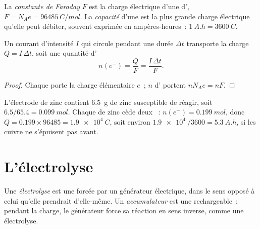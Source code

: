\begin{definition}\label{def:g12:cells-and-electrolysis:capacity}
La \emph{constante de Faraday} $F$ est la
charge électrique d'une  d', $F = N_A e = \qty{96485}{C/mol}$.
La \emph{capacité} d'une  est la plus grande charge
électrique qu'elle peut débiter, souvent exprimée en ampères-heures~:
$\qty{1}{A.h} = \qty{3600}{C}$.
\end{definition}

\begin{proposition}\label{prop:g12:cells-and-electrolysis:charge}
Un courant d'intensité $I$ qui circule pendant une durée $\Delta t$
transporte la charge
$Q = I\,\Delta t$, soit une quantité d'
\[
  n(e^-) = \frac{Q}{F} = \frac{I\,\Delta t}{F} .
\]
\end{proposition}

\begin{proof}
Chaque  porte la charge élémentaire $e$~; $n$  d'
portent $n N_A e = n F$.
\end{proof}

\begin{example}\label{ex:g12:cells-and-electrolysis:capacity}
L'électrode de zinc contient \qty{6.5}{g} de zinc susceptible de
réagir, soit
$6.5/65.4 = \qty{0.099}{mol}$. Chaque  de zinc cède deux
~:
$n(e^-) = \qty{0.199}{mol}$, donc $Q = 0.199 \times 96485 = \qty{1.9e4}{C}$,
soit environ $\qty{1.9e4}{}/3600 = \qty{5.3}{A.h}$, si les  cuivre ne
s'épuisent pas avant.
\end{example}

\section{L'électrolyse}

\begin{definition}\label{def:g12:cells-and-electrolysis:electrolysis}
Une \emph{électrolyse} est une  forcée par un générateur électrique, dans le sens
opposé à celui qu'elle prendrait d'elle-même. Un
\emph{accumulateur} est une  rechargeable~:
pendant la charge, le générateur force sa réaction en sens inverse, comme
une électrolyse.
\end{definition}


